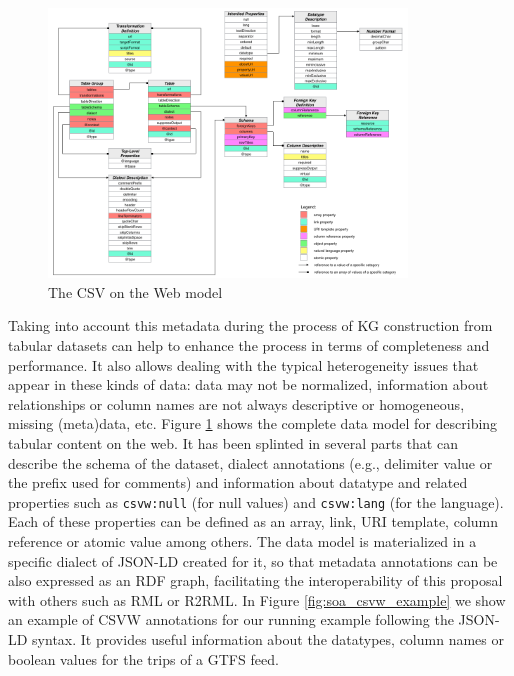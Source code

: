\begin{figure}[!ht]
\centering
\includegraphics[width=0.85\textwidth]{figures/state-of-the-art/csvw-model.png}
\caption{The CSV on the Web model\citep{tennison2015model}}
\label{fig:soa_csvw}
\end{figure}


Taking into account this metadata during the process of KG construction from tabular datasets can help to enhance the process in terms of completeness and performance. It also allows dealing with the typical heterogeneity issues that appear in these kinds of data: data may not be normalized, information about relationships or column names are not always descriptive or homogeneous, missing (meta)data, etc. Figure \ref{fig:soa_csvw} shows the complete data model for describing tabular content on the web. It has been splinted in several parts that can describe the schema of the dataset, dialect annotations (e.g., delimiter value or the prefix used for comments) and information about datatype and related properties such as \texttt{csvw:null} (for null values) and \texttt{csvw:lang} (for the language). Each of these properties can be defined as an array, link, URI template, column reference or atomic value among others. The data model is materialized in a specific dialect of JSON-LD created for it, so that metadata annotations can be also expressed as an RDF graph, facilitating the interoperability of this proposal with others such as RML or R2RML. In Figure \ref{fig:soa_csvw_example} we show an example of CSVW annotations for our running example following the JSON-LD syntax. It provides useful information about the datatypes, column names or boolean values for the trips of a GTFS feed.

